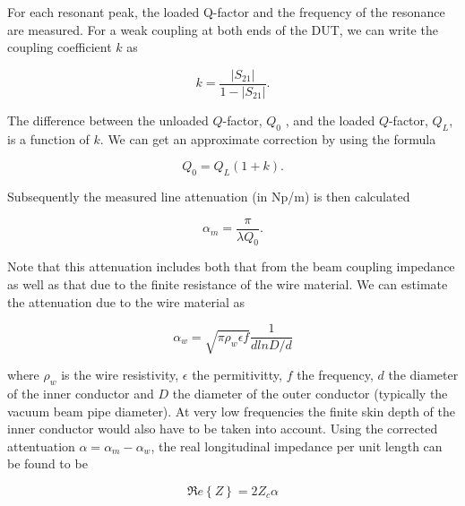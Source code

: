 \documentclass[review, number, sort&compress]{elsarticle}
\begin{document}
For each resonant peak, the loaded Q-factor and the frequency of the resonance are measured. For a weak coupling at both ends of the DUT, we can write the coupling coefficient $k$ as

\begin{equation}
k = \frac{\left| S_{21} \right|}{1 - \left| S_{21} \right| }.
\label{eqn:coupling_coeff}
\end{equation}

The difference between the unloaded $Q$-factor, $Q_{0}$ , and the loaded $Q$-factor, $Q_{L}$, is a function of $k$. We can get an approximate correction by using the formula

\begin{equation}
Q_{0} = Q_{L} \left( 1 + k  \right).
\label{eqn:Q_correc}
\end{equation}

Subsequently the measured line attenuation (in Np/m) is then calculated

\begin{equation}
\alpha_{m} = \frac{\pi}{\lambda Q_{0}}.
\label{eqn:atten}
\end{equation}

Note that this attenuation includes both that from the beam coupling impedance as well as that due to the finite resistance of the wire material. We can estimate the attenuation due to the wire material as

\begin{equation}
\alpha_{w} = \sqrt{\pi \rho_{w} \epsilon f} \frac{1}{d ln D/d}
\label{eqn:wire_atten}
\end{equation}

where $\rho_{w}$ is the wire resistivity, $\epsilon$ the permitivitty, $f$ the frequency, $d$ the diameter of the inner conductor and $D$ the diameter of the outer conductor (typically the vacuum beam pipe diameter). At very low frequencies the finite skin depth of the inner conductor would also have to be taken into account. Using the corrected attentuation $\alpha = \alpha_{m} - \alpha_{w}$, the real longitudinal impedance per unit length can be found to be 

\begin{equation}
\Re e\left\{ Z \right\} = 2Z_{c} \alpha
\label{eqn:res_imp}
\end{equation}
\end{document}
